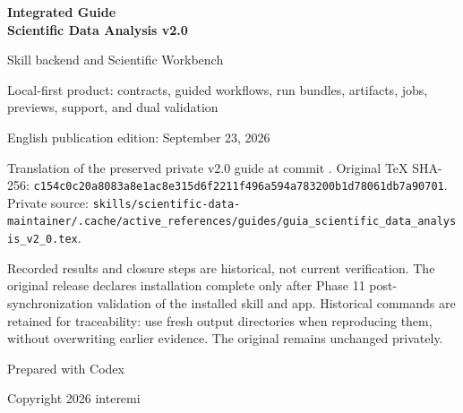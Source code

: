 \documentclass[11pt,a4paper]{article}
\newcommand{\code}[1]{\texttt{\detokenize{#1}}}
\begin{document}
\begin{titlepage}
\centering
\vspace*{1.0cm}
{\Huge\bfseries\color{titleblue} Integrated Guide\\[0.15cm]
Scientific Data Analysis v2.0\par}
\vspace{0.65cm}
{\Large Skill backend and Scientific Workbench\par}
\vspace{0.8cm}
{\large Local-first product: contracts, guided workflows, run bundles,
artifacts, jobs, previews, support, and dual validation\par}
\vspace{0.8cm}
{\large English publication edition: September 23, 2026\par}
\vspace{0.5cm}
\begin{minipage}{0.93\textwidth}
\small\raggedright
Translation of the preserved private v2.0 guide at commit \code{b9f6176}.
Original TeX SHA-256:
\nolinkurl{c154c0c20a8083a8e1ac8e315d6f2211f496a594a783200b1d78061db7a90701}.
Private source:
\nolinkurl{skills/scientific-data-maintainer/.cache/active_references/guides/guia_scientific_data_analysis_v2_0.tex}.

Recorded results and closure steps are historical, not current verification.
The original release declares installation complete only after Phase 11
post-synchronization validation of the installed skill and app. Historical commands are retained for
traceability: use fresh output directories when reproducing them, without
overwriting earlier evidence. The original remains unchanged privately.
\end{minipage}
\vfill
{\large Prepared with Codex\par}
{\large Copyright 2026 interemi\par}
\end{titlepage}

\clearpage
{}
\fancyfoot[C]{\thepage}
\begin{abstract}
\code{scientific-data-analysis} v2.0 is the first release designed as an
integrated product with Scientific Workbench. The skill remains the
deterministic engine for scripts, JSON contracts, run bundles, artifacts,
warnings, errors, provenance, and original preservation. Scientific Workbench
is the macOS app for planning, guidance, execution, jobs, previews, support
bundles, and confirmation controls.

Scientific execution remains local-first, with read-only originals or copied
inputs. The original guide presents Ollama as the local AI route without a
paid API, with OpenAI, Grok/xAI, and Gemini as optional cloud providers. The
Codex bridge supports extended reasoning, code, and reporting; it does not
replace deterministic capability execution.
\end{abstract}
\tableofcontents
\newpage
{}
\end{document}
